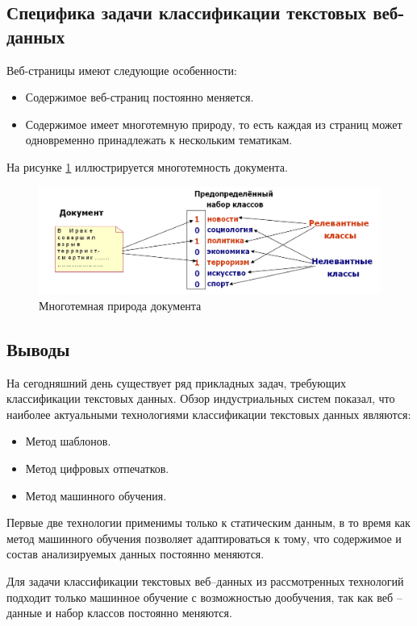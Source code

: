 \documentclass[russian, utf8, emptystyle]{eskdtext}
\begin{document}
\subsection{Специфика задачи классификации текстовых веб-данных}

Веб-страницы имеют следующие особенности:
\begin{itemize}
	\item Содержимое веб-страниц постоянно меняется.
	\item Содержимое имеет многотемную природу, то есть каждая  из страниц может одновременно принадлежать к нескольким тематикам.
\end{itemize}

На рисунке \ref{fig:nature_doc} иллюстрируется многотемность документа.
	\begin{figure}[h]
		\begin{center}
			\includegraphics[width=14cm]{pic/Nature.png}
			\caption{Многотемная природа документа}
			\label{fig:nature_doc}
		\end{center}
	\end{figure}
\subsection{Выводы}
На сегодняшний день существует ряд прикладных задач, требующих классификации текстовых данных. Обзор индустриальных систем показал, что наиболее актуальными технологиями классификации текстовых данных являются:
\begin{itemize}
	\item Метод шаблонов.
	\item Метод цифровых отпечатков.
	\item Метод машинного обучения.
\end{itemize}

Первые две технологии применимы только к статическим данным, в то время как метод машинного обучения позволяет адаптироваться к тому, что содержимое и состав анализируемых данных постоянно меняются.

Для задачи классификации текстовых веб–данных из рассмотренных технологий подходит только машинное обучение с возможностью дообучения, так как веб – данные и набор классов постоянно меняются. 
\end{document}
